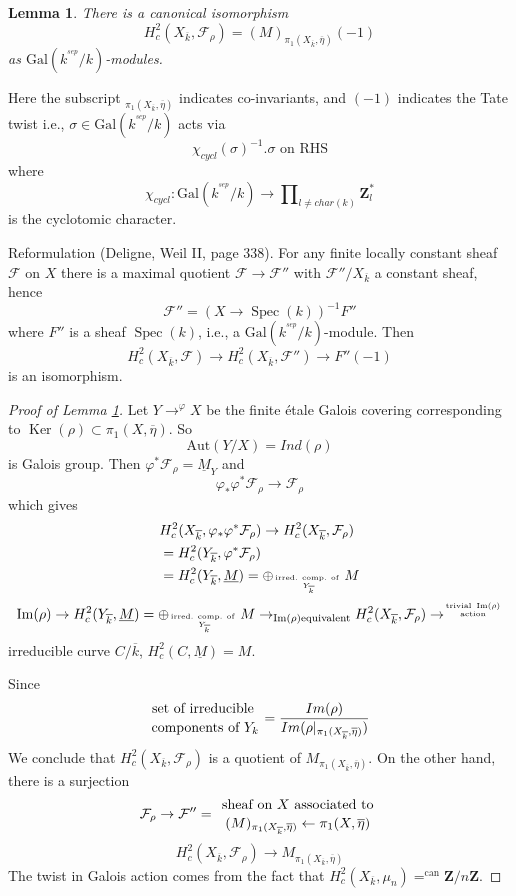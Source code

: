 \documentclass{stacks-project}
\theoremstyle{plain}
\newtheorem{lemma}[subsection]{Lemma}
\theoremstyle{definition}
\theoremstyle{remark}
\numberwithin{equation}{subsection}
\def\Spec{\mathop{\mathrm{Spec}}}
\def\Ker{\mathop{\mathrm{Ker}}}
\def\Im{\mathop{\mathrm{Im}}}
\begin{document}
\begin{lemma}
\label{lemma-identify-h2c}
There is a canonical isomorphism
$$
H_c^2(X_{\overline{k}}, \mathcal{F}_\rho)=(M)_{\pi_1(X_{\overline{k}},
\overline\eta)}(-1)
$$
as $\text{Gal}(k^{^{sep}}/k)$-modules.
\end{lemma}

\noindent
Here the subscript ${}_{\pi_1(X_{\overline{k}}, \overline\eta)}$
indicates co-invariants, and $(-1)$ indicates the Tate twist i.e.,
$\sigma\in \text{Gal}(k^{^{sep}}/k)$ acts via
$$
\chi_{cycl}(\sigma)^{-1}.\sigma\text{ on RHS}
$$
where
$$
\chi_{cycl} :
\text{Gal}(k^{^{sep}}/k)
\to
\prod\nolimits_{l\neq char(k)}\mathbf{Z}_l^*
$$
is the cyclotomic character.

\medskip\noindent
Reformulation (Deligne, Weil II, page 338). For any finite locally
constant sheaf $\mathcal{F}$ on $X$ there is a maximal quotient $\mathcal{F}\to
\mathcal{F}''$ with $\mathcal{F}''/X_{\overline{k}}$ a constant sheaf, hence
$$
\mathcal{F}'' = (X\to \Spec(k))^{-1}F''
$$
where $F''$ is a sheaf $\Spec(k)$, i.e., a
$\text{Gal}(k^{^{sep}}/k)$-module. Then
$$
H_c^2(X_{\overline{k}}, \mathcal{F})\to H_c^2(X_{\overline{k}},
\mathcal{F}'')\to F''(-1)
$$
is an isomorphism.

\begin{proof}[Proof of Lemma \ref{lemma-identify-h2c}]
Let $Y\to^{\varphi}X$ be the finite \'etale Galois covering
corresponding to $\Ker(\rho) \subset \pi_1(X, \overline\eta)$. So
$$
\text{Aut}(Y/X)=Ind(\rho)
$$
is Galois group. Then $\varphi^*\mathcal{F}_\rho =\underline M_Y$ and
$$
\varphi_*\varphi^*\mathcal{F}_\rho\to \mathcal{F}_\rho
$$
which gives
\begin{align*}
& H_c^2(X_{\overline{k}}, \varphi_*\varphi^*\mathcal{F}_\rho) \to
H_c^2(X_{\overline{k}}, \mathcal{F}_\rho)\\
& =H_c^2(Y_{\overline{k}}, \varphi^*\mathcal{F}_\rho)\\
& =H_c^2(Y_{\overline{k}}, \underline M) = \oplus_{\text{irred.
comp. of } \atop Y_{\overline{k}}}M
\end{align*}
$$
\Im(\rho) \to H_c^2(Y_{\overline{k}}, \underline M) =
\oplus_{\text{irred. comp. of } \atop Y_{\overline{k}}}
M \to_{\Im(\rho) \text{equivalent}} H_c^2(X_{\overline{k}},
\mathcal{F}_{\rho}) \to^{\text{trivial }
\Im(\rho) \atop \text{action}}
$$
irreducible curve $C/\overline{k}$, $H_c^2(C, \underline M)=M$.

\medskip\noindent
Since
$$
{\text{set of irreducible } \atop \text{components of }Y_k} =
\frac{Im(\rho)}{Im(\rho|_{\pi_1(X_{\overline{k}}, \overline \eta)})}
$$
We conclude that $H_c^2(X_{\overline{k}}, \mathcal{F}_\rho)$ is a
quotient of $M_{\pi_1(X_{\overline{k}}, \overline \eta)}$. On the other hand,
there is a surjection
$$
\mathcal{F}_\rho\to \mathcal{F}'' = {\text{ sheaf on }
X\text{ associated to } \atop (M)_{\pi_1(X_{\overline{k}}, \overline
\eta)}\leftarrow\pi_1(X, \overline \eta)}
$$
$$
H_c^2(X_{\overline{k}}, \mathcal{F}_\rho)\to
M_{\pi_1(X_{\overline{k}}, \overline\eta)}
$$
The twist in Galois action comes from the fact that
$H_c^2(X_{\overline{k}}, \mu_n)=^{\text{can}} \mathbf{Z}/n\mathbf{Z}$.
\end{proof}
\end{document}
